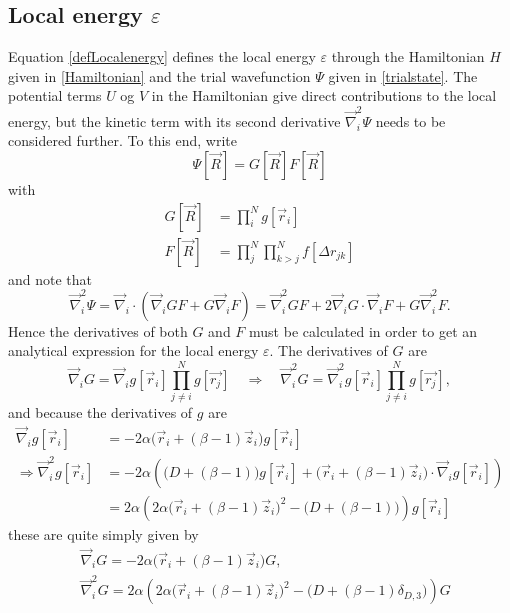 \documentclass[a4paper,8pt]{article}
\begin{document}
\subsection{Local energy $\varepsilon$} \label{localenergy}
Equation \eqref{defLocalenergy} defines the local energy $\varepsilon$ through the Hamiltonian $H$ given in \eqref{Hamiltonian} and the trial wavefunction $\Psi$ given in \eqref{trialstate}. The potential terms $U$ og $V$ in the Hamiltonian give direct contributions to the local energy, but the kinetic term with its second derivative $\vec{\nabla}_i^2\Psi$ needs to be considered further. To this end, write
\begin{equation}
\Psi[\vec{R}] = G[\vec{R}]F[\vec{R}]
\end{equation}
with
\begin{align}
G[\vec{R}] &= \prod\limits_i^N g[\vec{r}_i] \\
F[\vec{R}] &= \prod\limits_j^N\prod\limits_{k > j}^N f[\Delta{r}_{jk}] 
\end{align}
and note that
\begin{equation}
\vec{\nabla}_i^2\Psi = \vec{\nabla}_i\cdot\left(\vec{\nabla}_i G F + G \vec{\nabla}_i F\right) = \vec{\nabla}_i^2 G F + 2\vec{\nabla}_i G \cdot \vec{\nabla}_i F + G \vec{\nabla}_i^2 F. \label{Lap_Psi_1} 
\end{equation}
Hence the derivatives of both $G$ and $F$ must be calculated in order to get an analytical expression for the local energy $\varepsilon$. The derivatives of $G$ are 
\begin{equation}
\vec{\nabla}_i G = \vec{\nabla}_i g[\vec{r}_i] \prod\limits_{j \neq i}^N g[\vec{r_j}] \quad\Longrightarrow\quad \vec{\nabla}_i^2 G = \vec{\nabla}_i^2 g[\vec{r}_i] \prod\limits_{j \neq i}^N g[\vec{r_j}],
\end{equation}
and because the derivatives of $g$ are
\begin{align}
\vec{\nabla}_i g[\vec{r}_i] &= -2\alpha\Big(\vec{r}_i+(\beta-1)\vec{z}_i\Big)g[\vec{r}_i] \\
\Longrightarrow \vec{\nabla}_i^2 g[\vec{r}_i] &= -2\alpha\left(\Big(D+(\beta-1)\Big)g[\vec{r}_i]+\Big(\vec{r}_i+(\beta-1)\vec{z}_i\Big)\cdot\vec{\nabla}_i g[\vec{r}_i]\right) \nonumber\\
&= 2\alpha\left(2\alpha\Big(\vec{r}_i+(\beta-1)\vec{z}_i\Big)^2-\Big(D+(\beta-1)\Big)\right)g[\vec{r}_i]
\end{align}
these are quite simply given by
\begin{align}
&\vec{\nabla}_i G = -2\alpha\Big(\vec{r}_i+(\beta-1)\vec{z}_i\Big)G, \label{grad_G}\\
&\vec{\nabla}_i^2G = 2\alpha\left(2\alpha\Big(\vec{r}_i+(\beta-1)\vec{z}_i\Big)^2-\Big(D+(\beta-1)\delta_{D,3}\Big)\right)G \label{Lap_G}
\end{align}
\end{document}
